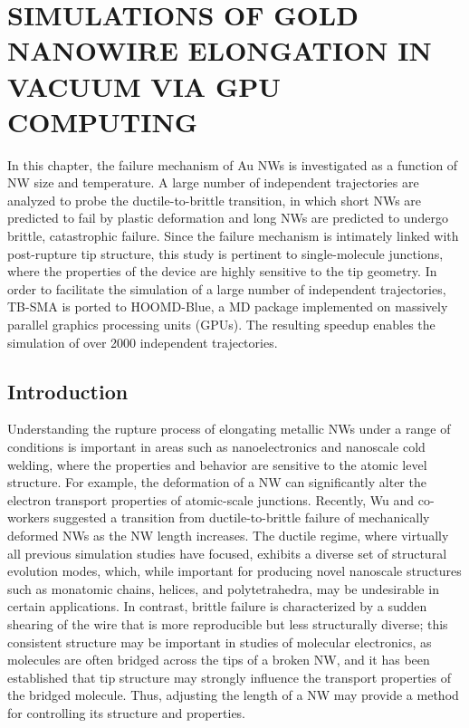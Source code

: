 \documentclass[10pt]{report}  %
\newcommand\findent{\hspace*{\parindent}}
\begin{document}
\chapter{SIMULATIONS OF GOLD NANOWIRE ELONGATION IN VACUUM VIA GPU COMPUTING}

\findent In this chapter, the failure mechanism of Au NWs is investigated as a function of NW size and temperature. A large number of independent trajectories are analyzed to probe the ductile-to-brittle \cite{Wu:2012} transition, in which short NWs are predicted to fail by plastic deformation and long NWs are predicted to undergo brittle, catastrophic failure. Since the failure mechanism is intimately linked with post-rupture tip structure, this study is pertinent to single-molecule junctions, where the properties of the device are highly sensitive to the tip geometry.\cite{Muller:2006,Haiss:2009,French:2012} In order to facilitate the simulation of a large number of independent trajectories, TB-SMA is ported to HOOMD-Blue, a MD package implemented on massively parallel graphics processing units (GPUs). The resulting speedup enables the simulation of over 2000 independent trajectories. 


\section{Introduction}

\findent Understanding the rupture process of elongating metallic NWs \cite{Richter:2009,Seo:2011,Yue:2011,Yue:2012} under a range of conditions is important in areas such as nanoelectronics \cite{Nitzan:2003} and nanoscale cold welding,\cite{Lu:2010} where the properties and behavior are sensitive to the atomic level structure. For example, the deformation of a NW can significantly alter the electron transport properties of atomic-scale junctions.\cite{Iacovella:2011} Recently, Wu and co-workers \cite{Wu:2012} suggested a transition from ductile-to-brittle failure of mechanically deformed NWs as the NW length increases.  The ductile regime, where virtually all previous simulation studies have focused, \cite{Gall:2004,Coura:2004,Sato:2005,Wang:2007,Koh:2005,Koh:2006,Park:2005,Pu_JCP:2007,Pu:2008,Iacovella:2011,French:2011} exhibits a diverse set of structural evolution modes, which, while important for producing novel nanoscale structures such as monatomic chains, \cite{Coura:2004,Sato:2005,Koh:2005,Koh:2006,French:2011,Yanson:1998,Scheer:1998} helices,\cite{Koh:2005,Park:2005,French:2011} and polytetrahedra,\cite{Iacovella:2011} may be undesirable in certain applications. In contrast, brittle failure is characterized by a sudden shearing of the wire that is more reproducible but less structurally diverse; this consistent structure may be important in studies of molecular electronics, as molecules are often bridged across the tips of a broken NW,\cite{Reed:1997} and it has been established that tip structure may strongly influence the transport properties of the bridged molecule.\cite{Muller:2006,Haiss:2009,French:2012}  Thus, adjusting the length of a NW may provide a method for controlling its structure and properties. 
\end{document}
